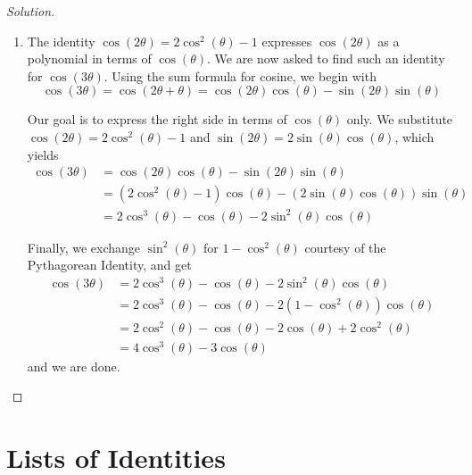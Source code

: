 \documentclass{ximera}
\begin{document}
\begin{example}
\begin{proof}[Solution]
\begin{enumerate}
      \item The identity \( \cos(2\theta) = 2\cos^{2}(\theta) - 1 \) expresses \( \cos(2\theta) \) as a polynomial in terms of \( \cos(\theta) \).
      We are now asked to find such an identity for \( \cos(3\theta) \).
      Using the sum formula for cosine, we begin with
      \[
        \cos(3\theta) = \cos(2\theta + \theta) = \cos(2\theta)\cos(\theta) - \sin(2\theta)\sin(\theta)
      \]
      
      Our goal is to express the right side in terms of \( \cos(\theta) \) only.
      We substitute \( \cos(2\theta) = 2\cos^{2}(\theta) -1 \) and \( \sin(2\theta) = 2\sin(\theta)\cos(\theta) \), which yields
      \begin{align*}
        \cos(3\theta) &= \cos(2\theta)\cos(\theta) - \sin(2\theta)\sin(\theta) \\[2pt]
        &= \left(2\cos^{2}(\theta) - 1\right) \cos(\theta) - \left(2 \sin(\theta) \cos(\theta) \right)\sin(\theta) \\[2pt]
        &= 2\cos^{3}(\theta)- \cos(\theta) - 2 \sin^2(\theta) \cos(\theta)
      \end{align*}

    Finally, we exchange \( \sin^{2}(\theta) \) for \( 1 - \cos^{2}(\theta) \) courtesy of the Pythagorean Identity, and get
    \begin{align*}
      \cos(3\theta) &= 2\cos^3(\theta) - \cos(\theta) - 2 \sin^2(\theta)\cos(\theta) \\[2pt]
      &= 2\cos^3(\theta)- \cos(\theta) - 2 \left(1 - \cos^2(\theta)\right)\cos(\theta) \\[2pt]
      &= 2\cos^2(\theta) - \cos(\theta) - 2\cos(\theta) + 2\cos^2(\theta) \\[2pt]
      &= 4\cos^{3}(\theta)- 3\cos(\theta)
    \end{align*}
    and we are done.
    \end{enumerate}
    \vspace{-2\baselineskip}
  \end{proof}
\end{example}

\section{Lists of Identities}
\end{document}

